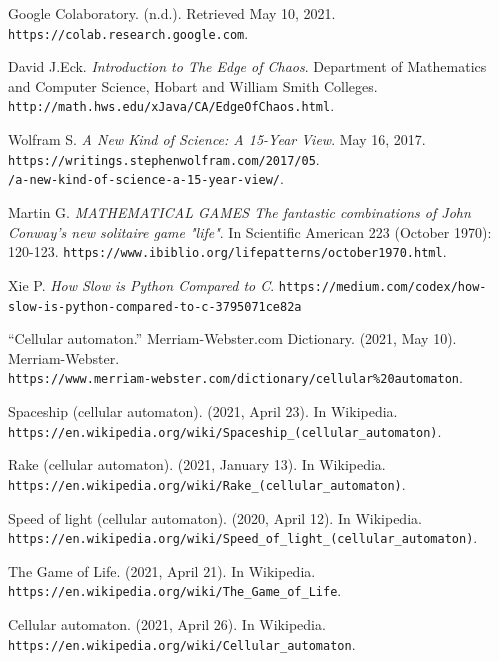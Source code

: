 \documentclass[12pt]{article}
\numberwithin{figure}{section} %
\begin{document}
\begin{thebibliography}{9}
Google Colaboratory. (n.d.). Retrieved May 10, 2021. 
\\\texttt{https://colab.research.google.com}. 

David J.Eck.
\textit{Introduction to The Edge of Chaos}.
Department of Mathematics and Computer Science, Hobart and William Smith Colleges. 
\\\texttt{http://math.hws.edu/xJava/CA/EdgeOfChaos.html}. 

Wolfram S. 
\textit{A New Kind of Science: A 15-Year View}.
May 16, 2017.
\\\texttt{https://writings.stephenwolfram.com/2017/05}. 
\\\texttt{/a-new-kind-of-science-a-15-year-view/}.
 
Martin G.
\textit{MATHEMATICAL GAMES The fantastic combinations of John Conway's new solitaire game "life"}.
In Scientific American 223 (October 1970): 120-123.
\texttt{https://www.ibiblio.org/lifepatterns/october1970.html}. 

Xie P. 
\textit{How Slow is Python Compared to C}. 
\texttt{https://medium.com/codex/how-slow-is-python-compared-to-c-3795071ce82a}

“Cellular automaton.” Merriam-Webster.com Dictionary. (2021, May 10). Merriam-Webster. 
\\\texttt{https://www.merriam-webster.com/dictionary/cellular\%20automaton}. 

Spaceship (cellular automaton). (2021, April 23). In Wikipedia.
\\\texttt{https://en.wikipedia.org/wiki/Spaceship\_(cellular\_automaton)}.

Rake (cellular automaton). (2021, January 13). In Wikipedia.
\\\texttt{https://en.wikipedia.org/wiki/Rake\_(cellular\_automaton)}.

Speed of light (cellular automaton). (2020, April 12). In Wikipedia.
\\\texttt{https://en.wikipedia.org/wiki/Speed\_of\_light\_(cellular\_automaton)}.

The Game of Life. (2021, April 21). In Wikipedia. 
\\\texttt{https://en.wikipedia.org/wiki/The\_Game\_of\_Life}.

Cellular automaton. (2021, April 26). In Wikipedia. 
\\\texttt{https://en.wikipedia.org/wiki/Cellular\_automaton}.


\end{thebibliography}
\end{document}
